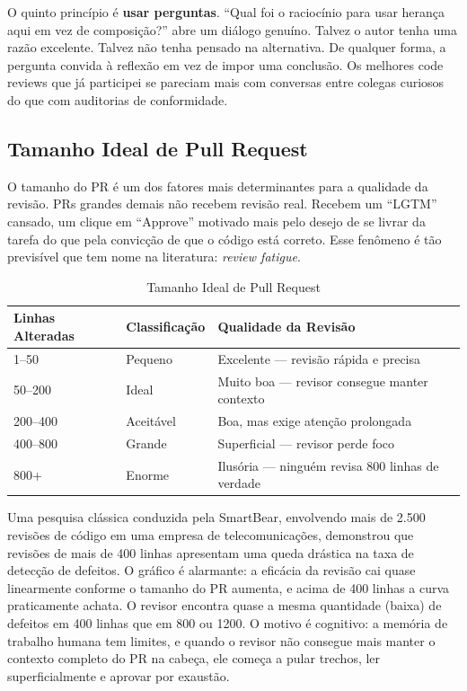O quinto princípio é \textbf{usar perguntas}. ``Qual foi o raciocínio para usar herança
aqui em vez de composição?'' abre um diálogo genuíno. Talvez o autor tenha uma razão
excelente. Talvez não tenha pensado na alternativa. De qualquer forma, a pergunta
convida à reflexão em vez de impor uma conclusão. Os melhores code reviews que já
participei se pareciam mais com conversas entre colegas curiosos do que com auditorias
de conformidade.

\subsection{Tamanho Ideal de Pull Request}

O tamanho do PR é um dos fatores mais determinantes para a qualidade da revisão.
PRs grandes demais não recebem revisão real. Recebem um ``LGTM'' cansado, um
clique em ``Approve'' motivado mais pelo desejo de se livrar da tarefa do que pela
convicção de que o código está correto. Esse fenômeno é tão previsível que tem nome
na literatura: \textit{review fatigue}.

\begin{table}[htbp]
\centering
\caption{Tamanho Ideal de Pull Request}
\begin{tabular}{lll}
\toprule
\textbf{Linhas Alteradas} & \textbf{Classificação} & \textbf{Qualidade da Revisão} \\
\midrule
1--50    & Pequeno   & Excelente --- revisão rápida e precisa \\
50--200  & Ideal     & Muito boa --- revisor consegue manter contexto \\
200--400 & Aceitável & Boa, mas exige atenção prolongada \\
400--800 & Grande    & Superficial --- revisor perde foco \\
800+     & Enorme    & Ilusória --- ninguém revisa 800 linhas de verdade \\
\bottomrule
\end{tabular}
\end{table}

Uma pesquisa clássica conduzida pela SmartBear, envolvendo mais de 2.500 revisões de
código em uma empresa de telecomunicações, demonstrou que revisões de mais de 400
linhas apresentam uma queda drástica na taxa de detecção de defeitos. O gráfico é
alarmante: a eficácia da revisão cai quase linearmente conforme o tamanho do PR
aumenta, e acima de 400 linhas a curva praticamente achata. O revisor encontra
quase a mesma quantidade (baixa) de defeitos em 400 linhas que em 800 ou 1200. O
motivo é cognitivo: a memória de trabalho humana tem limites, e quando o revisor
não consegue mais manter o contexto completo do PR na cabeça, ele começa a pular
trechos, ler superficialmente e aprovar por exaustão.

